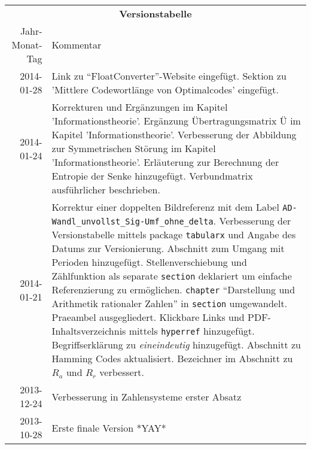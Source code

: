 \begin{table}[htp]
\centering
\begin{tabularx}{\columnwidth}{rp{}}
\multicolumn{2}{c}{\textbf{Versionstabelle}} \\
Jahr-Monat-Tag & Kommentar \\ \hline
2014-01-28 & Link zu "`FloatConverter"'-Website eingefügt.
Sektion zu 'Mittlere Codewortlänge von Optimalcodes' eingefügt.
\\
2014-01-24 & Korrekturen und Ergänzungen im Kapitel 'Informationstheorie'. 
Ergänzung Übertragungsmatrix $Ü$ im Kapitel 'Informationstheorie'.
Verbesserung der Abbildung zur Symmetrischen Störung im Kapitel 'Informationstheorie'.
Erläuterung zur Berechnung der Entropie der Senke hinzugefügt.
Verbundmatrix ausführlicher beschrieben.
\\
2014-01-21 & Korrektur einer doppelten Bildreferenz mit dem Label \texttt{AD-Wandl\_unvollst\_Sig-Umf\_ohne\_delta}.  
Verbesserung der Versionstabelle mittels package \texttt{tabularx} und Angabe des Datums zur Versionierung. 
Abschnitt zum Umgang mit Perioden hinzugefügt. 
Stellenverschiebung und Zählfunktion als separate \texttt{section} deklariert um einfache Referenzierung zu ermöglichen.
\texttt{chapter} "`Darstellung und Arithmetik rationaler Zahlen"' in \texttt{section} umgewandelt. 
Praeambel ausgegliedert.
Klickbare Links und PDF-Inhaltsverzeichnis mittels \texttt{hyperref} hinzugefügt.
Begriffserklärung zu \emph{eineindeutig} hinzugefügt.
Abschnitt zu Hamming Codes aktualisiert.
Bezeichner im Abschnitt zu $R_a$ und $R_r$ verbessert.
\\
2013-12-24 & Verbesserung in Zahlensysteme erster Absatz \\
2013-10-28 & Erste finale Version *YAY* \\
\end{tabularx}
\end{table}